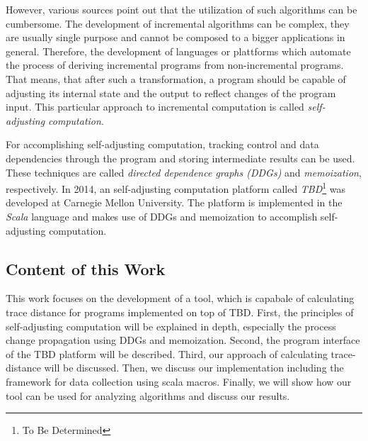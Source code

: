 However, various sources point out that the utilization of such algorithms can be cumbersome. The development of incremental algorithms can be complex, they are usually single purpose and cannot be composed to a bigger applications in general. Therefore, the development of languages or plattforms which automate the process of deriving incremental programs from non-incremental programs. That means, that after such a transformation, a program should be capable of adjusting its internal state and the output to reflect changes of the program input. This particular approach to incremental computation is called \textit{self-adjusting computation}.

For accomplishing self-adjusting computation, tracking control and data dependencies through the program and storing intermediate results can be used. These techniques are called \textit{directed dependence graphs (DDGs)} and \textit{memoization}, respectively. 
In 2014, an self-adjusting computation platform called \textit{TBD}\footnote{To Be Determined} was developed at Carnegie Mellon University. The platform is implemented in the \textit{Scala} language and makes use of DDGs and memoization to accomplish self-adjusting computation. 

\subsection{Content of this Work}

This work focuses on the development of a tool, which is capabale of calculating trace distance for programs implemented on top of TBD. First, the principles of self-adjusting computation will be explained in depth, especially the process change propagation using DDGs and memoization. Second, the program interface of the TBD platform will be described. Third, our approach of calculating trace-distance will be discussed. Then, we discuss our implementation including the framework for data collection using scala macros. 
Finally, we will show how our tool can be used for analyzing algorithms and discuss our results. 